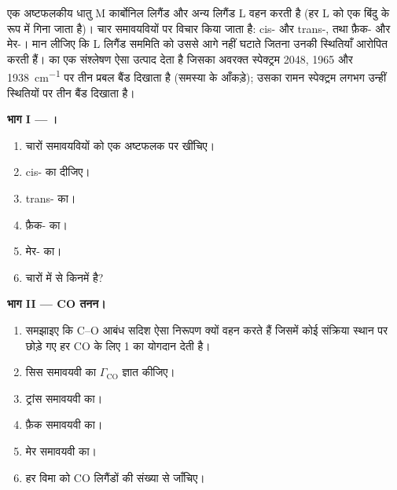 \begin{problem}
\label{pb:b3:group-theory-applied:1}
एक अष्टफलकीय धातु M कार्बोनिल लिगैंड और अन्य लिगैंड L वहन करती है (हर L को
एक बिंदु के रूप में गिना जाता है)। चार समावयवियों पर विचार किया जाता है: cis- और
trans-, तथा फ़ैक- और मेर-। मान लीजिए कि L लिगैंड
सममिति को उससे आगे नहीं घटाते जितना उनकी स्थितियाँ आरोपित करती हैं।
 का एक संश्लेषण ऐसा उत्पाद देता है जिसका अवरक्त स्पेक्ट्रम 2048, 1965 और
\qty{1938}{cm^{-1}} पर तीन प्रबल बैंड दिखाता है (समस्या के आँकड़े); उसका रामन
स्पेक्ट्रम लगभग उन्हीं स्थितियों पर तीन बैंड दिखाता है।

\medskip\noindent\textbf{भाग I --- ।}
\begin{enumerate}
  \item चारों समावयवियों को एक अष्टफलक पर खींचिए।
  \item cis- का  दीजिए।
  \item trans- का।
  \item फ़ैक- का।
  \item मेर- का।
  \item चारों में से किनमें  है?
\end{enumerate}

\medskip\noindent\textbf{भाग II --- CO तनन।}
\begin{enumerate}[resume]
  \item समझाइए कि C--O आबंध सदिश ऐसा निरूपण क्यों वहन करते हैं जिसमें कोई
        संक्रिया स्थान पर छोड़े गए हर CO के लिए 1 का योगदान देती है।
  \item सिस समावयवी का $\Gamma_{\mathrm{CO}}$ ज्ञात कीजिए।
  \item ट्रांस समावयवी का।
  \item फ़ैक समावयवी का।
  \item मेर समावयवी का।
  \item हर विमा को CO लिगैंडों की संख्या से जाँचिए।
\end{enumerate}


\end{problem}
